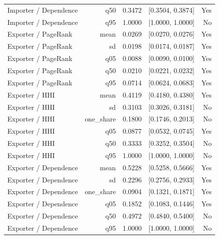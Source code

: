 \documentclass[pdftex,12pt,openright,a4paper,oneside]{book}
\begin{document}
\begin{longtable}{@{}p{}rrrr@{}}
Importer / Dependence & q50 & 0.3472 & [0.3504, 0.3874] & Yes \\

Importer / Dependence & q95 & 1.0000 & [1.0000, 1.0000] & No \\

Exporter / PageRank & mean & 0.0269 & [0.0270, 0.0276] & Yes \\

Exporter / PageRank & sd & 0.0198 & [0.0174, 0.0187] & Yes \\

Exporter / PageRank & q05 & 0.0088 & [0.0090, 0.0100] & Yes \\

Exporter / PageRank & q50 & 0.0210 & [0.0221, 0.0232] & Yes \\

Exporter / PageRank & q95 & 0.0714 & [0.0624, 0.0683] & Yes \\

Exporter / HHI & mean & 0.4119 & [0.4180, 0.4380] & Yes \\

Exporter / HHI & sd & 0.3103 & [0.3026, 0.3181] & No \\

Exporter / HHI & one\_share & 0.1800 & [0.1746, 0.2013] & No \\

Exporter / HHI & q05 & 0.0877 & [0.0532, 0.0745] & Yes \\

Exporter / HHI & q50 & 0.3333 & [0.3252, 0.3504] & No \\

Exporter / HHI & q95 & 1.0000 & [1.0000, 1.0000] & No \\

Exporter / Dependence & mean & 0.5228 & [0.5258, 0.5666] & Yes \\

Exporter / Dependence & sd & 0.2296 & [0.2756, 0.2933] & Yes \\

Exporter / Dependence & one\_share & 0.0904 & [0.1321, 0.1871] & Yes \\

Exporter / Dependence & q05 & 0.1852 & [0.1083, 0.1446] & Yes \\

Exporter / Dependence & q50 & 0.4972 & [0.4840, 0.5400] & No \\

Exporter / Dependence & q95 & 1.0000 & [1.0000, 1.0000] & No \\

\bottomrule\end{longtable}
\end{document}
